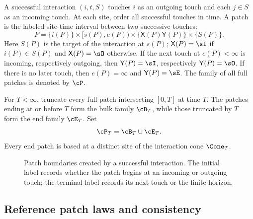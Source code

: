 \begin{definition}[Patch]
\label{def:patch}
A successful interaction \((i,t,S)\) touches \(i\) as an outgoing
touch and each \(j\in S\) as an incoming touch. At each site, order
all successful touches in time. A patch is the labeled site-time
interval between two successive touches:
\[
  P
  =
  \{i(P)\}\times[s(P),e(P))
  \times\{\mathsf X(P)\mathsf Y(P)\}
  \times\{S(P)\}.
\]
Here \(S(P)\) is the target of the interaction at \(s(P)\);
\(\mathsf X(P)=\sI\) if \(i(P)\in S(P)\) and
\(\mathsf X(P)=\sO\) otherwise. If the next touch at \(e(P)<\infty\)
is incoming, respectively outgoing, then
\(\mathsf Y(P)=\sI\), respectively \(\mathsf Y(P)=\sO\). If there is
no later touch, then \(e(P)=\infty\) and
\(\mathsf Y(P)=\sE\). The family of all full patches is denoted by
\(\cP\).
\end{definition}

\begin{definition}
\label{def:finite-patch-families}
For \(T<\infty\), truncate every full patch intersecting
\([0,T]\) at time \(T\). The patches ending at or before \(T\) form
the bulk family \(\cB_T\), while those truncated by \(T\) form the end
family \(\cE_T\). Set
\[
  \cP_T=\cB_T\cup\cE_T.
\]
Every end patch is based at a distinct site of the interaction cone
\(\Cone_T\).
\end{definition}

\begin{figure}[htbp]
  \centering
  
  \caption{Patch boundaries created by a successful interaction. The
  initial label records whether the patch begins at an incoming or
  outgoing touch; the terminal label records its next touch or the
  finite horizon.}
  \label{fig:patch-schematic}
\end{figure}

\subsection{Reference patch laws and consistency}

